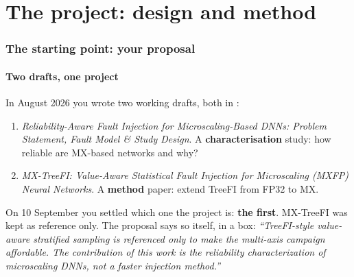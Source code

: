 \part{The project: design and method}

\section{The starting point: your proposal}

\subsection{Two drafts, one project}
In August 2026 you wrote two working drafts, both in :
\begin{enumerate}
\item \emph{Reliability-Aware Fault Injection for Microscaling-Based DNNs: Problem Statement, Fault Model \& Study Design}. A
 \textbf{characterisation} study: how reliable are MX-based networks and why?
\item \emph{MX-TreeFI: Value-Aware Statistical Fault Injection for Microscaling (MXFP) Neural Networks}. A \textbf{method} paper: extend TreeFI from FP32 to MX.
\end{enumerate}
On 10 September you settled which one the project is: \textbf{the first}. MX-TreeFI was kept as reference only. The proposal says so itself, in a box: \emph{``TreeFI-style value-aware stratified sampling is referenced only to make the multi-axis campaign affordable.
The contribution of this work is the reliability characterization of microscaling DNNs, not a faster injection method.''}

